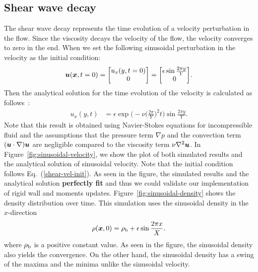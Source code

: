\subsection{Shear wave decay}
The shear wave decay represents the time evolution of a
velocity perturbation in the flow.
Since the viscosity decays the velocity of the flow,
the velocity converges to zero in the end.
When we set the following sinusoidal perturbation in the velocity
as the initial condition:
\begin{equation}
  \begin{aligned}
    \boldsymbol{u}(\boldsymbol{x}, t = 0) =
    \begin{bmatrix}
      u_x(y, t = 0) \\
      0 \\
    \end{bmatrix}
    =  
    \begin{bmatrix}
      \epsilon \sin \frac{2\pi y}{Y} \\
        0 \\
      \end{bmatrix}
  \end{aligned}.
  \label{shear-vel-init}
\end{equation}
Then the analytical solution for the time evolution of 
the velocity is calculated as follows~\cite{fei2018three}:
\begin{equation}
  \begin{aligned}
    u_x(y, t) &= 
    \epsilon \exp\biggl(
      -\nu \biggl(
        \frac{2\pi}{Y}
      \biggr)^2 t\biggr) \sin \frac{2\pi y}{Y}.
  \end{aligned}
  \label{sinusoidal-vel-analytical-solution}
\end{equation}
Note that this result is obtained using Navier-Stokes equations for incompressible fluid
and the assumptions that the pressure term $\nabla p$ and
the convection term $(\boldsymbol{u} \cdot \nabla) \boldsymbol{u}$ are negligible 
compared to the viscosity term $\nu \nabla^2 \boldsymbol{u}$.
In Figure~\ref{fig:sinusoidal-velocity}, we show the plot of both
simulated results and the analytical solution of sinusoidal velocity.
Note that the initial condition follows Eq.~(\ref{shear-vel-init}). 
As seen in the figure, the simulated results and the analytical solution
{\bf perfectly fit} and thus we could validate our implementation of
rigid wall and moments updates.
Figure~\ref{fig:sinusoidal-density} shows the density distribution
over time.
This simulation uses the sinusoidal density in the $x$-direction
\begin{equation}
\begin{aligned}
  \rho(\boldsymbol{x}, 0) = \rho_{\rm b} + \epsilon \sin \frac{2 \pi x}{X}.
\end{aligned}
\label{sinusoidal-density-init}
\end{equation}
where $\rho_{\rm b}$ is a positive constant value.
As seen in the figure, the sinusoidal density also
yields the convergence.
On the other hand, the sinusoidal density has
a swing of the maxima and the minima unlike the sinusoidal velocity.

